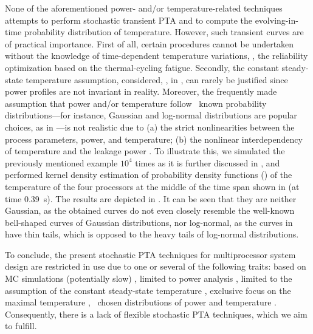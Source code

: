 None of the aforementioned power- and/or temperature-related techniques attempts to perform stochastic transient PTA and to compute the evolving-in-time probability distribution of temperature.
However, such transient curves are of practical importance.
First of all, certain procedures cannot be undertaken without the knowledge of time-dependent temperature variations, \eg, the reliability optimization based on the thermal-cycling fatigue. Secondly, the constant steady-state temperature assumption, considered, \eg, in \cite{juan2011, juan2012}, can rarely be justified since power profiles are not invariant in reality.
Moreover, the frequently made assumption that power and/or temperature follow \apriori\ known probability distributions---for instance, Gaussian and log-normal distributions are popular choices, as in \cite{srivastava2010, juan2012, bhardwaj2006}---is not realistic due to (a) the strict nonlinearities between the process parameters, power, and temperature; (b) the nonlinear interdependency of temperature and the leakage power \cite{liu2007}.
To illustrate this, we simulated the previously mentioned example $10^4$ times as it is further discussed in , and performed kernel density estimation of probability density functions (\pdfs) of the temperature of the four processors at the middle of the time span shown in  (at time 0.39~s).
The results are depicted in . It can be seen that they are neither Gaussian, as the obtained curves do not even closely resemble the well-known bell-shaped curves of Gaussian distributions, nor log-normal, as the curves in  have thin tails, which is opposed to the heavy tails of log-normal distributions.

To conclude, the present stochastic PTA techniques for multiprocessor system design are restricted in use due to one or several of the following traits: based on MC simulations (potentially slow) \cite{chandra2010}, limited to power analysis \cite{chandra2010, shen2009, bhardwaj2006, ghanta2006}, limited to the assumption of the constant steady-state temperature \cite{juan2011, juan2012}, exclusive focus on the maximal temperature \cite{juan2011}, \apriori\ chosen distributions of power and temperature \cite{srivastava2010, juan2012, bhardwaj2006}.
Consequently, there is a lack of flexible stochastic PTA techniques, which we aim to fulfill.
